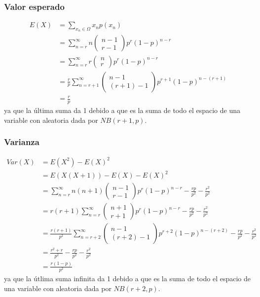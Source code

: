 \documentclass{article}
\begin{document}
\begin{tcolorbox}[breakable]
    \subsubsection*{Valor esperado}
    \begin{align*}
        E(X) 
        &= \sum_{x_n \in \Omega} x_np(x_n) \\
        &= \sum_{n=r}^\infty n\left( \begin{matrix} n-1 \\ r-1 \end{matrix} \right)p^r(1-p)^{n-r} \\
        &= \sum_{n=r}^\infty r\left( \begin{matrix} n \\ r \end{matrix} \right)p^r(1-p)^{n-r} \\  
        &= \frac{r}{p}\sum_{n=r+1}^\infty \left( \begin{matrix} n-1 \\ (r+1)-1 \end{matrix} \right)p^{r+1}(1-p)^{n-(r+1)} \\
        &= \frac{r}{p}
    \end{align*}
    ya que la última suma da 1 debido a que es la suma de todo el espacio de una variable con aleatoria dada por $NB(r+1,p)$.
    \subsubsection*{Varianza}
    \begin{align*}
        Var(X) 
        &= E(X^2)-E(X)^2 \\
        &= E(X(X+1))-E(X)-E(X)^2 \\
        &= \sum_{n=r}^\infty n(n+1)\left( \begin{matrix} n-1 \\ r-1 \end{matrix} \right)p^r(1-p)^{n-r}
        -\frac{rp}{p^2} - \frac{r^2}{p^2} \\
        &= r(r+1) \sum_{n=r}^\infty \left( \begin{matrix} n+1 \\ r+1 \end{matrix} \right)p^r(1-p)^{n-r} 
        -\frac{rp}{p^2} - \frac{r^2}{p^2} \\
        &= \frac{r(r+1)}{p^2} \sum_{n=r+2}^\infty \left( \begin{matrix} n-1 \\ (r+2)-1 \end{matrix} \right)p^{r+2}(1-p)^{n-(r+2)}
        -\frac{rp}{p^2} - \frac{r^2}{p^2} \\
        &= \frac{r^2+r}{p^2}-\frac{rp}{p^2} - \frac{r^2}{p^2} \\
        &= \frac{r(1-p)}{p^2}
    \end{align*}
    ya que la útlima suma infinita da 1 debido a que es la suma de todo el espacio de una variable con aleatoria dada por $NB(r+2,p)$.

\end{tcolorbox}
\end{document}
